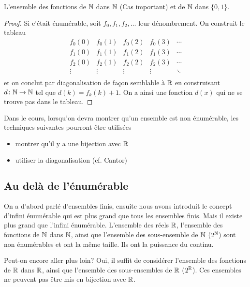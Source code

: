 \begin{myexem}
  \label{exem:fNN}
 L'ensemble des fonctions de $\mathbb{N}$ dans $\mathbb{N}$ (Cas important) et de $\mathbb{N}$ dans $\{0, 1\}$.
 \begin{proof}
   Si c'était énumérable, soit $f_0, f_1, f_2, \ldots$ leur dénombrement.
   On construit le tableau
   \[
     \begin{array}{ccccc}
       f_0(0) & f_0(1) & f_0(2) & f_0(3) & \cdots\\
       f_1(0) & f_1(1) & f_1(2) & f_1(3) & \cdots\\
       f_2(0) & f_2(1) & f_2(2) & f_2(3) & \cdots\\
       \vdots & \vdots & \vdots & \vdots & \ddots\\
     \end{array}
   \]
   et on conclut par diagonalisation de façon semblable à $\mathbb{R}$
   en construisant $d\colon \mathbb{N} \to \mathbb{N}$ tel que $d(k) = f_k(k)+1$.
   On a ainsi une fonction $d(x)$ qui ne se trouve pas dans le tableau.
 \end{proof}
\end{myexem}

Dans le cours, lorsqu'on devra montrer qu'un ensemble est non énumérable,
les techniques suivantes pourront être utilisées
\begin{itemize}
	\item montrer qu'il y a une bijection avec $\mathbb{R}$
	\item utiliser la diagonalisation (cf. Cantor)
\end{itemize}


\subsection{Au delà de l'énumérable}
\label{subsec:au_dela_de_l_enumerable}
On a d'abord parlé d'ensembles finis, ensuite nous avons introduit le concept d'infini
énumérable qui est plus grand que tous les ensembles finis. Mais il existe plus grand
que l'infini énumérable. L'ensemble des réels $\mathbb{R}$, l'ensemble des fonctions de $\mathbb{N}$ dans $\mathbb{N}$, ainsi que
l'ensemble des sous-ensemble de $\mathbb{N}$ ($2^{\mathbb{N}}$) sont non énumérables et ont la même taille. Ils ont la puissance du continu.

Peut-on encore aller plus loin?  Oui, il suffit de considérer l'ensemble des fonctions de $\mathbb{R}$ dans $\mathbb{R}$, ainsi que
l'ensemble des sous-ensembles de $\mathbb{R}$ ($2^{\mathbb{R}}$). Ces ensembles ne peuvent pas être mis en bijection avec $\mathbb{R}$.

